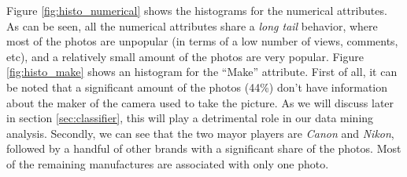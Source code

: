 \documentclass[letter,12pt]{article}
\begin{document}
\begin{table}[!h]
\centering
\caption{Summary statistics for the numerical attributes.}
\label{tbl:stat_num}
\end{table}

Figure \ref{fig:histo_numerical} shows the histograms for the numerical attributes. As can be seen, all the numerical attributes share a \emph{long tail} behavior, where most of the photos are unpopular (in terms of a low number of views, comments, etc), and a relatively small amount of the photos are very popular. Figure \ref{fig:histo_make} shows an histogram for the ``Make'' attribute. First of all, it can be noted that a significant amount of the photos (44\%) don't have information about the maker of the camera used to take the picture. As we will discuss later in section \ref{sec:classifier}, this will play a detrimental role in our data mining analysis. Secondly, we can see that the two mayor players are \emph{Canon} and \emph{Nikon}, followed by a handful of other brands with a significant share of the photos. Most of the remaining manufactures are associated with only one photo.
\end{document}
